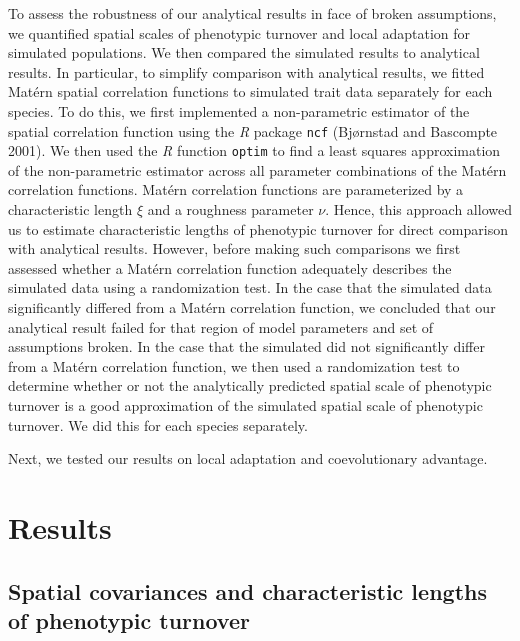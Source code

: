 \documentclass{article}
\begin{document}
To assess the robustness of our analytical results in face of broken
assumptions, we quantified spatial scales of phenotypic turnover and
local adaptation for simulated populations. We then compared the
simulated results to analytical results. In particular, to simplify
comparison with analytical results, we fitted Matérn spatial correlation
functions to simulated trait data separately for each species. To do
this, we first implemented a non-parametric estimator of the spatial
correlation function using the \emph{R} package \texttt{ncf} (Bjørnstad
and Bascompte 2001). We then used the \emph{R} function \texttt{optim}
to find a least squares approximation of the non-parametric estimator
across all parameter combinations of the Matérn correlation functions.
Matérn correlation functions are parameterized by a characteristic
length \(\xi\) and a roughness parameter \(\nu\). Hence, this approach
allowed us to estimate characteristic lengths of phenotypic turnover for
direct comparison with analytical results. However, before making such
comparisons we first assessed whether a Matérn correlation function
adequately describes the simulated data using a randomization test. In
the case that the simulated data significantly differed from a Matérn
correlation function, we concluded that our analytical result failed for
that region of model parameters and set of assumptions broken. In the
case that the simulated did not significantly differ from a Matérn
correlation function, we then used a randomization test to determine
whether or not the analytically predicted spatial scale of phenotypic
turnover is a good approximation of the simulated spatial scale of
phenotypic turnover. We did this for each species separately.

Next, we tested our results on local adaptation and coevolutionary
advantage.

\hypertarget{results}{%
\section{Results}\label{results}}

\hypertarget{spatial-covariances-and-characteristic-lengths-of-phenotypic-turnover}{%
\subsection{Spatial covariances and characteristic lengths of phenotypic
turnover}\label{spatial-covariances-and-characteristic-lengths-of-phenotypic-turnover}}
\end{document}
